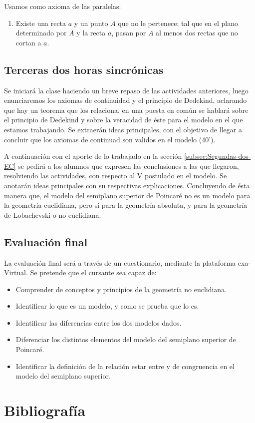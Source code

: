 \documentclass[oneside,spanish]{amsart}
\numberwithin{equation}{section}
\numberwithin{figure}{section}
\theoremstyle{definition}
\begin{document}
Usamos como axioma de las paralelas:
\begin{enumerate}[label=Ax V.\arabic{enumi}]
	\item Existe una recta $a$ y un punto $A$ que no le pertenece; tal que en el plano determinado por $A$ y la recta $a$, pasan por $A$ al menos dos rectas que no cortan a $a$.
\end{enumerate}

\subsection{Terceras dos horas sincrónicas\label{subsec:Terceras-dos-sinc}}

Se iniciará la clase haciendo un breve repaso de las actividades anteriores, luego enunciaremos los axiomas de continuidad y el principio de Dedekind, aclarando que hay un teorema que los relaciona. en una puesta en común se hablará sobre el principio de Dedekind y sobre la veracidad de éste para el modelo en el que estamos trabajando. Se extraerán ideas principales, con el objetivo de llegar a concluir que los axiomas de continuad son validos en el modelo (40'). 

A continuación con el aporte de lo trabajado en la sección \ref{subsec:Segundas-dos-EC} se pedirá a los alumnos que expresen las conclusiones a las que llegaron, resolviendo las actividades, con respecto al V postulado en el modelo. Se anotarán ideas principales con su respectivas explicaciones. Concluyendo de ésta manera que, el modelo del semiplano superior de Poincaré no es un modelo para la geometría euclidiana, pero si para la geometría absoluta, y para la geometría de Lobachevski o no euclidiana.

\subsection{Evaluación final}

La evaluación final será a través de un cuestionario, mediante la plataforma exa-Virtual. Se pretende que el cursante sea capaz de:
\begin{itemize}
	\item Comprender de conceptos y principios de la geometría no euclidiana.
	\item Identificar lo que es un modelo, y como se prueba que lo es.
	\item Identificar las diferencias entre los dos modelos dados. 
	\item Diferenciar los distintos elementos del modelo del semiplano superior de Poincaré.
	\item Identificar la definición de la relación estar entre y de congruencia en el modelo del semiplano superior.
\end{itemize}

\section{Bibliografía}

\printbibliography
\end{document}
